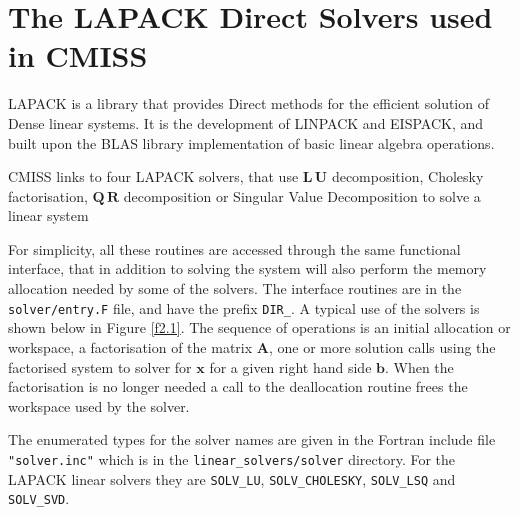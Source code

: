 
\section{The LAPACK Direct Solvers used in CMISS}\label{s2.0}

LAPACK is a library that provides Direct methods for the efficient solution
of Dense linear systems. It is the development of LINPACK and EISPACK, and 
built upon the BLAS library implementation of basic linear algebra operations.

CMISS links to four LAPACK solvers, that use $\mathbf{L \, U}$ decomposition,
Cholesky factorisation, $\mathbf{Q \, R}$ decomposition or Singular Value 
Decomposition to solve a linear system

For simplicity, all these routines are accessed through the same functional 
interface, that in addition to solving the system will also perform the memory
allocation needed by some of the solvers. The interface routines are in the
{\tt solver/entry.F} file, and have the prefix {\tt DIR\_}. A typical use
of the solvers is shown below in Figure \ref{f2.1}. 
The sequence of operations is an initial allocation or workspace, a 
factorisation of the matrix $\mathbf{A}$, one or more solution calls using
the factorised system to solver for $\mathbf{x}$ for a given right hand side
$\mathbf{b}$. When the factorisation is no longer needed a call to the
deallocation routine frees the workspace used by the solver.

The enumerated types for the solver names are given in the Fortran include 
file {\tt "solver.inc"} which is in the {\tt linear\_solvers/solver}
directory. For the LAPACK linear solvers they are {\tt SOLV\_LU}, 
{\tt SOLV\_CHOLESKY}, {\tt SOLV\_LSQ} and {\tt SOLV\_SVD}.

